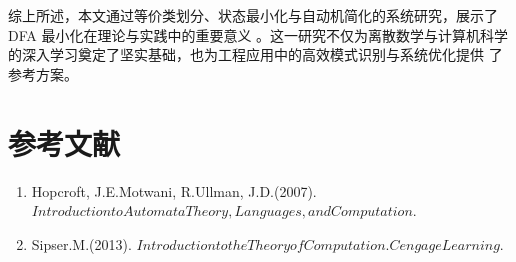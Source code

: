 \documentclass{article}
\begin{document}
综上所述，本文通过等价类划分、状态最小化与自动机简化的系统研究，展示了 DFA 最小化在理论与实践中的重要意义
。这一研究不仅为离散数学与计算机科学的深入学习奠定了坚实基础，也为工程应用中的高效模式识别与系统优化提供
了参考方案。



\newpage
\section{参考文献}
\begin{enumerate}
    \item Hopcroft, J.E.Motwani, R.Ullman, J.D.(2007). $Introduction to Automata Theory, Languages, and Computation.$
    \item Sipser.M.(2013). $Introduction to the Theory of Computation. Cengage Learning.$
\end{enumerate}
\end{document}
